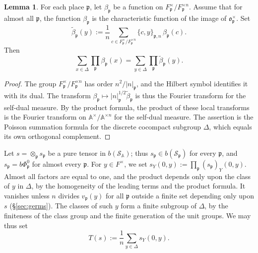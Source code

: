 \documentclass[reqno]{amsart}
\theoremstyle{plain}
\theoremstyle{definition}
\theoremstyle{itplain}
\newtheorem{lemma}[theorem]{Lemma}
\numberwithin{equation}{section}
\numberwithin{theorem}{section}
\begin{document}
\begin{lemma}\label{lemma:isotropy}
  For each place $\mathfrak{p}$, let $\beta_{\mathfrak{p}}$ be a function on $F_{\mathfrak{p}}^\times / F_{\mathfrak{p}}^{\times n}$.  Assume that for almost all $\mathfrak{p}$, the function $\beta_{\mathfrak{p}}$ is the characteristic function of the image of $\mathfrak{o}_{\mathfrak{p}}^\times$.  Set
  \begin{equation*}
    \tilde{\beta}_{\mathfrak{p}}(y) := \frac{1}{n} \sum_{c \in F_{\mathfrak{p}}^\times / F_{\mathfrak{p}}^{\times n}} \{c, y\}_{\mathfrak{p}, n} \, \beta_{\mathfrak{p}}(c).
  \end{equation*}
  Then
  \begin{equation*}
    \sum_{x \in \Delta} \prod_{\mathfrak{p}} \beta_{\mathfrak{p}}(x)
    =
    \sum_{y \in \Delta} \prod_{\mathfrak{p}} \tilde{\beta}_{\mathfrak{p}}(y).
  \end{equation*}
\end{lemma}
\begin{proof}
  The group $F_{\mathfrak{p}}^\times / F_{\mathfrak{p}}^{\times n}$ has order $n^2 / \lvert n \rvert_{\mathfrak{p}}$, and the Hilbert symbol identifies it with its dual.  The transform $\beta_{\mathfrak{p}} \mapsto \lvert n \rvert_{\mathfrak{p}}^{1/2} \tilde{\beta}_{\mathfrak{p}}$ is thus the Fourier transform for the self-dual measure.  By the product formula, the product of these local transforms is the Fourier transform on $\mathbb{A}^\times / \mathbb{A}^{\times n}$ for the self-dual measure.  The assertion is the Poisson summation formula for the discrete cocompact subgroup $\Delta$, which equals its own orthogonal complement.
\end{proof}

Let $s = \otimes_{\mathfrak{p}} s_{\mathfrak{p}}$ be a pure tensor in $b(\mathcal{S}_{\mathbb{A}})$; thus $s_{\mathfrak{p}} \in b(\mathcal{S}_{\mathfrak{p}})$ for every $\mathfrak{p}$, and $s_{\mathfrak{p}} = b \Phi_{\mathfrak{p}}^0$ for almost every $\mathfrak{p}$.  For $y \in F^\times$, we set $s_Y(0, y) := \prod_{\mathfrak{p}} (s_{\mathfrak{p}})_Y(0, y)$.  Almost all factors are equal to one, and the product depends only upon the class of $y$ in $\Delta$, by the homogeneity of the leading terms and the product formula.  It vanishes unless $n$ divides $v_{\mathfrak{p}}(y)$ for all $\mathfrak{p}$ outside a finite set depending only upon $s$ (\S\ref{sec:germs}).  The classes of such $y$ form a finite subgroup of $\Delta$, by the finiteness of the class group and the finite generation of the unit groups.  We may thus set
\begin{equation*}
  T(s) := \frac{1}{n} \sum_{y \in \Delta} s_Y(0, y).
\end{equation*}
\end{document}
